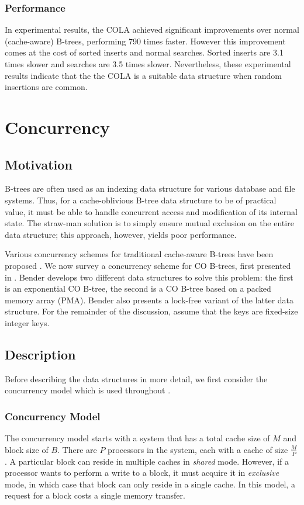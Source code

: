 \documentclass{style}
\begin{document}
\subsubsection{Performance}

In experimental results, the COLA achieved significant improvements over
normal (cache-aware) B-trees, performing 790 times faster. However this
improvement comes at the cost of sorted inserts and normal searches. Sorted
inserts are 3.1 times slower and searches are 3.5 times slower. Nevertheless,
these experimental results indicate that the the COLA is a suitable data
structure when random insertions are common.

\section{Concurrency}

\subsection{Motivation}
B-trees are often used as an indexing data structure for various
database and file systems. Thus, for a cache-oblivious B-tree data structure
to be of practical value, it must be able to handle concurrent access and modification
of its internal state. The straw-man solution is to simply ensure mutual exclusion
on the entire data structure; this approach, however, yields poor performance.

Various concurrency schemes for traditional cache-aware B-trees have been
proposed \cite{BayerS77, LehmanY81}. We now survey a concurrency scheme for CO
B-trees, first presented in \cite{BenderFiGi05}. Bender develops two different
data structures to solve this problem: the first is an exponential CO B-tree,
the second is a CO B-tree based on a packed memory array (PMA). Bender
also presents a lock-free variant of the latter data structure. For
the remainder of the discussion, assume that the keys are fixed-size integer
keys.

\subsection{Description}
Before describing the data structures in more detail, we first consider
the concurrency model which is used throughout \cite{BenderFiGi05}.

\subsubsection{Concurrency Model}
The concurrency model starts with a system that has a total cache
size of $M$ and block size of $B$. There are $P$ processors in the
system, each with a cache of size $\frac{M}{P}$. A particular block
can reside in multiple caches in \textit{shared} mode. However, if a
processor wants to perform a write to a block, it must acquire it in 
\textit{exclusive} mode, in which case that block can only reside in
a single cache. In this model, a request for a block costs a single
memory transfer.
\end{document}
